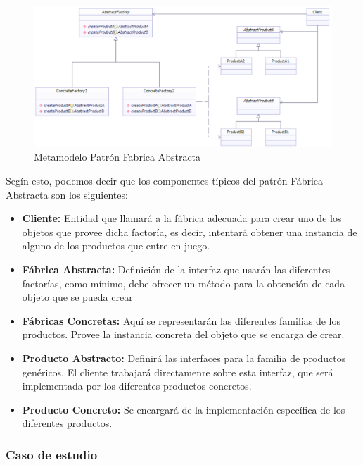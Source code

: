 \begin{figure}[th!]
	\centering
	\includegraphics[width=1.0\linewidth]{arquitectura/imagenes/modeloFabAbs}
	\caption{Metamodelo Patrón Fabrica Abstracta}
	\label{fig:metamodelo fabrica abstracta}
\end{figure}

Segín esto, podemos decir que los componentes típicos del patrón Fábrica Abstracta son los siguientes:

\begin{itemize}
	\item \textbf{Cliente: }Entidad que llamará a la fábrica adecuada para crear uno de los objetos que provee dicha factoría, es decir, intentará obtener una instancia de alguno de los productos que entre en juego.
	\item \textbf{Fábrica Abstracta: }Definición de la interfaz que usarán las diferentes factorías, como mínimo, debe ofrecer un método para la obtención de cada objeto que se pueda crear
	\item \textbf{Fábricas Concretas: } Aquí se representarán las diferentes familias de los productos. Provee la instancia concreta del objeto que se encarga de crear.
	\item \textbf{Producto Abstracto: }Definirá las interfaces para la familia de productos genéricos. El cliente trabajará directamenre sobre esta interfaz, que será implementada por los diferentes productos concretos.
	\item \textbf{Producto Concreto: } Se encargará de la implementación específica de los diferentes productos.
\end{itemize}



\subsubsection{Caso de estudio}

